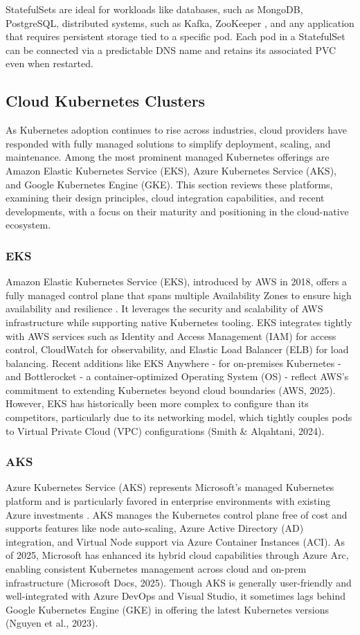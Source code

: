StatefulSets are ideal for workloads like databases, such as MongoDB, PostgreSQL, distributed systems, such as Kafka, ZooKeeper \cite{zookeeper-docs}, and any application that requires persistent storage tied to a specific pod. Each pod in a StatefulSet can be connected via a predictable DNS name and retains its associated PVC even when restarted.

\subsection{Cloud Kubernetes Clusters}
As Kubernetes adoption continues to rise across industries, cloud providers have responded with fully managed solutions to simplify deployment, scaling, and maintenance. Among the most prominent managed Kubernetes offerings are Amazon Elastic Kubernetes Service (EKS), Azure Kubernetes Service (AKS), and Google Kubernetes Engine (GKE). This section reviews these platforms, examining their design principles, cloud integration capabilities, and recent developments, with a focus on their maturity and positioning in the cloud-native ecosystem.

\subsubsection{EKS}
Amazon Elastic Kubernetes Service (EKS), introduced by AWS in 2018, offers a fully managed control plane that spans multiple Availability Zones to ensure high availability and resilience \cite{aws-docs}. It leverages the security and scalability of AWS infrastructure while supporting native Kubernetes tooling. EKS integrates tightly with AWS services such as Identity and Access Management (IAM) for access control, CloudWatch for observability, and Elastic Load Balancer (ELB) for load balancing. Recent additions like EKS Anywhere - for on-premises Kubernetes - and Bottlerocket - a container-optimized Operating System (OS) - reflect AWS's commitment to extending Kubernetes beyond cloud boundaries (AWS, 2025). However, EKS has historically been more complex to configure than its competitors, particularly due to its networking model, which tightly couples pods to Virtual Private Cloud (VPC) configurations (Smith \& Alqahtani, 2024).

\subsubsection{AKS}
Azure Kubernetes Service (AKS) represents Microsoft's managed Kubernetes platform and is particularly favored in enterprise environments with existing Azure investments \cite{azure-docs}. AKS manages the Kubernetes control plane free of cost and supports features like node auto-scaling, Azure Active Directory (AD) integration, and Virtual Node support via Azure Container Instances (ACI). As of 2025, Microsoft has enhanced its hybrid cloud capabilities through Azure Arc, enabling consistent Kubernetes management across cloud and on-prem infrastructure (Microsoft Docs, 2025). Though AKS is generally user-friendly and well-integrated with Azure DevOps and Visual Studio, it sometimes lags behind Google Kubernetes Engine (GKE) in offering the latest Kubernetes versions (Nguyen et al., 2023).


